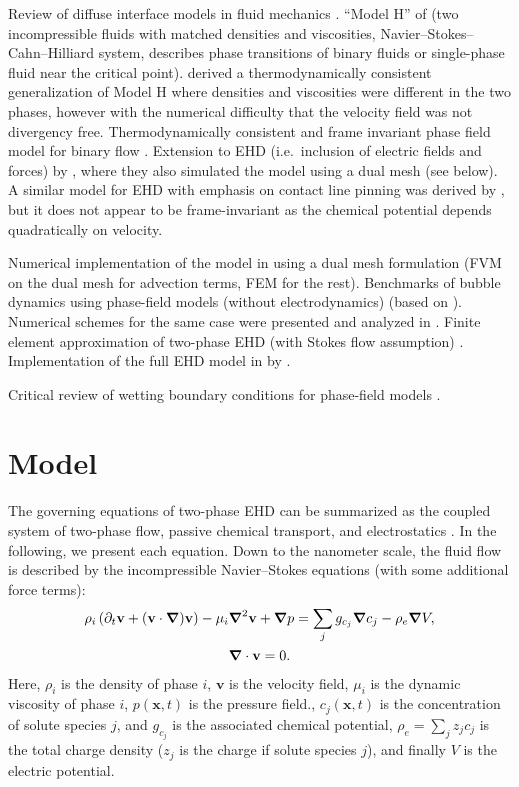 \documentclass[preprint,pre,superscriptaddress]{revtex4-1}
\renewcommand{\v}[1]{\ensuremath{\mathbf{#1}}} %
\newcommand{\gv}[1]{\ensuremath{\mbox{\boldmath$ #1 $}}}
\newcommand{\grad}[1]{\gv{\nabla} #1} %
\renewcommand{\div}[1]{\gv{\nabla} \cdot #1} %
\newcommand{\laplacian}[1]{\grad^2 #1}
\newcommand{\pdt}[1]{\partial_t #1}
\begin{document}
Review of diffuse interface models in fluid mechanics \cite{anderson1998}.
``Model H'' of \citet{hohenberg1977} (two incompressible fluids with matched densities and viscosities, Navier--Stokes--Cahn--Hilliard system, describes phase transitions of binary fluids or single-phase fluid near the critical point).
\citet{lowengrub1998} derived a thermodynamically consistent generalization of Model H where densities and viscosities were different in the two phases, however with the numerical difficulty that the velocity field was not divergency free.
Thermodynamically consistent and frame invariant phase field model for binary flow \cite{abels2012}.
Extension to EHD (i.e.~inclusion of electric fields and forces) by \citet{campillo-funollet2012}, where they also simulated the model using a dual mesh (see below).
A similar model for EHD with emphasis on contact line pinning was derived by \citet{nochetto2014}, but it does not appear to be frame-invariant as the chemical potential depends quadratically on velocity.

Numerical implementation of the model in \cite{abels2012} using a dual mesh formulation (FVM on the dual mesh for advection terms, FEM for the rest).
Benchmarks of bubble dynamics using phase-field models (without electrodynamics) \cite{aland2012} (based on \cite{hysing2009}).
Numerical schemes for the same case were presented and analyzed in \cite{guillen-gonzalez2014,grun2016}.
Finite element approximation of two-phase EHD (with Stokes flow assumption) \cite{nurnberg2017}.
Implementation of the full EHD model in \cite{campillo-funollet2012} by \cite{metzger2015}.

Critical review of wetting boundary conditions for phase-field models \cite{huang2015}.

\section{Model}
The governing equations of two-phase EHD can be summarized as the coupled system of two-phase flow, passive chemical transport, and electrostatics \cite{campillo-funollet2012}.
In the following, we present each equation. Down to the nanometer scale, the fluid flow is described by the incompressible Navier--Stokes equations (with some additional force terms):
\begin{gather}
  \rho_i \left( \pdt {\v v} + (\v v \cdot \grad ) \v v \right)  - \mu_i \laplacian \v v + \grad p = \sum_j g_{c_j} \grad c_j - \rho_e \grad V, \label{eq:sharp_NS1}\\
  \div \v v = 0. \label{eq:sharp_NS2}
\end{gather}
Here, $\rho_i$ is the density of phase $i$, $\v v$ is the velocity field, $\mu_i$ is the dynamic viscosity of phase $i$, $p(\v x, t)$ is the pressure field., $c_j (\v x, t)$ is the concentration of solute species $j$, and $g_{c_j}$ is the associated chemical potential, $ \rho_e = \sum_j z_j c_j$ is the total charge density ($z_j$ is the charge if solute species $j$), and finally $V$ is the electric potential.
\end{document}
